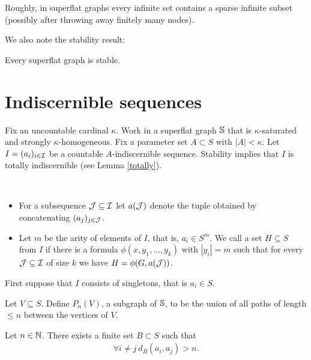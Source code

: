 Roughly, in superflat graphs every infinite set contains a sparse infinite subset (possibly after throwing away finitely many nodes).

We also note the stability result:
\begin{Theorem} 
  Every superflat graph is stable.
\end{Theorem}

\section{Indiscernible sequences}

Fix an uncountable cardinal $\kappa$.
Work in a superflat graph $\mathbb S$ that is $\kappa$-saturated and strongly $\kappa$-homogeneous.
Fix a parameter set $A \subset S$ with $|A| < \kappa$.
Let $I = (a_i)_{i \in \operatorname{\mathcal I}}$ be a countable $A$-indiscernible sequence.
Stability implies that $I$ is totally indiscernible (see Lemma \ref{totally}).

\begin{Definition} \ 
  \begin{itemize}
  \item For a subsequence $\operatorname{\mathcal J} \subseteq \operatorname{\mathcal I}$ let $a(\operatorname{\mathcal J})$ denote the tuple obtained by concatenating $(a_j)_{j \in \operatorname{\mathcal J}}$.
  \item Let $m$ be the arity of elements of $I$, that is, $a_i \in S^m$.
    We call a set $H \subseteq S$ \defn{uniformly definable} from $I$ if there
    is a formula $\phi(x, y_1, \ldots, y_k)$ with $|y_i| = m$
    such that for every $\operatorname{\mathcal J} \subseteq \operatorname{\mathcal I}$ of size $k$ we have $H = \phi(G, a(\operatorname{\mathcal J}))$.
  \end{itemize}
\end{Definition}

First suppose that $I$ consists of singletons, that is $a_i \in S$.

\begin{Definition}
  Let $V \subseteq S$. Define $P_n(V)$, a subgraph of $\mathbb S$, to be the union of all paths of length $\leq n$ between the vertices of $V$.
\end{Definition}

\begin{Lemma} \label{lm_bump}
  Let $n \in \mathbb{N}$.
  There exists a finite set $B \subset S$ such that
  \begin{align*}
    \forall i \neq j \ d_B(a_i, a_j) > n.
  \end{align*}
\end{Lemma}

